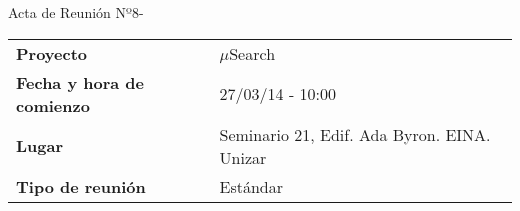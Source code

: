 \begin{center}	
\Large{Acta de Reunión Nº8\hspace{0.25em}-\hspace{0.25em}\tituloReunion}
\end{center}
\vspace{1.5em}

\begin{longtable}{ | L{\tabcolsep} |
				     L{\tabcolsep} | }
\hline %
  \\
\hline %
{\bf Proyecto} & $\mu$Search \\ 
\hline %
{\bf Fecha y hora de comienzo} & 27/03/14 - 10:00 \\
\hline %
{\bf Lugar} & Seminario 21, Edif. Ada Byron. EINA. Unizar \\
\hline %
{\bf Tipo de reunión} & Estándar \\
\hline %
\end{longtable}


